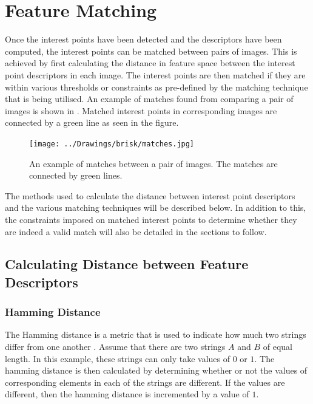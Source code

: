 \documentclass[11pt]{report}
\begin{document}
\chapter{Feature Matching}
\label{sec:matching}
Once the interest points have been detected and the descriptors have been computed, the interest points can be matched between pairs of images. This is achieved by first calculating the distance in feature space between the interest point descriptors in each image. The interest points are then matched if they are within various thresholds or constraints as pre-defined by the matching technique that is being utilised. An example of matches found from comparing a pair of images is shown in . Matched interest points in corresponding images are connected by a green line as seen in the figure.\\

\begin{figure}[h!] 
  \centering
    \texttt{[image: ../Drawings/brisk/matches.jpg]}
    \caption{An example of matches between a pair of images. The matches are connected by green lines.}
    \label{fig:matchesIntro}
\end{figure}

The methods used to calculate the distance between interest point descriptors and the various matching techniques will be described below. In addition to this, the constraints imposed on matched interest points to determine whether they are indeed a valid match will also be detailed in the sections to follow.\\

\section{Calculating Distance between Feature Descriptors}
\label{sec:distance}

\subsection{Hamming Distance}
\label{sec:hamming}
The Hamming distance is a metric that is used to indicate how much two strings differ from one another \cite{Banzal2007}. Assume that there are two strings $A$ and $B$ of equal length. In this example, these strings can only take values of $0$ or $1$. The hamming distance is then calculated by determining whether or not the values of corresponding elements in each of the strings are different. If the values are different, then the hamming distance is incremented by a value of $1$.\\
\end{document}
